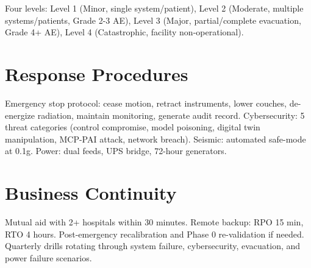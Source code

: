 \documentclass[11pt,letterpaper]{article}
\begin{document}
Four levels: Level 1 (Minor, single system/patient), Level 2 (Moderate,
multiple systems/patients, Grade 2-3 AE), Level 3 (Major, partial/complete
evacuation, Grade 4+ AE), Level 4 (Catastrophic, facility non-operational).

\section{Response Procedures}

Emergency stop protocol: cease motion, retract instruments, lower couches,
de-energize radiation, maintain monitoring, generate audit record.
Cybersecurity: 5 threat categories (control compromise, model poisoning,
digital twin manipulation, MCP-PAI attack, network breach). Seismic: automated
safe-mode at 0.1g. Power: dual feeds, UPS bridge, 72-hour generators.

\section{Business Continuity}

Mutual aid with 2+ hospitals within 30 minutes. Remote backup: RPO 15 min,
RTO 4 hours. Post-emergency recalibration and Phase 0 re-validation if needed.
Quarterly drills rotating through system failure, cybersecurity, evacuation,
and power failure scenarios.
\end{document}
